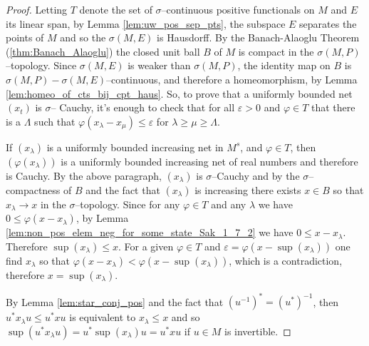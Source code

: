 \begin{proof}
  \leanok
  Letting $T$ denote the set of $\sigma$--continuous positive functionals on $M$ and $E$ its linear span, by
  Lemma \ref{lem:uw_pos_sep_pts}, the subspace $E$ separates the points of $M$ and so the $\sigma(M,E)$
  is Hausdorff. By the Banach-Alaoglu Theorem (\ref{thm:Banach_Alaoglu}) the closed unit ball $B$ of $M$ is
  compact in the $\sigma(M,P)$--topology. Since $\sigma(M,E)$ is weaker than $\sigma(M,P)$, the identity
  map on $B$ is $\sigma(M,P)-\sigma(M,E)$--continuous, and therefore a homeomorphism,
  by Lemma \ref{lem:homeo_of_cts_bij_cpt_haus}. So, to prove that a uniformly bounded net $(x_{t})$ is $\sigma$--
  Cauchy, it's enough to check that for all $\varepsilon>0$ and $\varphi\in T$ that there is a $\Lambda$ such that
  $\varphi(x_{\lambda}-x_{\mu})\le \varepsilon$ for $\lambda \ge \mu \ge \Lambda$.
  
  If $(x_{\lambda})$ is a uniformly bounded increasing net in $M^{s}$, and $\varphi\in T$, then $(\varphi(x_{\lambda}))$ is
  a uniformly bounded increasing net of real numbers and therefore is Cauchy. By the above paragraph, $(x_{\lambda})$ is
  $\sigma$--Cauchy and by the $\sigma$--compactness of $B$ and the fact that $(x_{\lambda})$ is increasing there exists $x\in B$
  so that $x_{\lambda} \to x$ in the $\sigma$--topology. Since for any $\varphi\in T$ and any $\lambda$ we have 
  $0 \le \varphi(x-x_{\lambda})$, by Lemma \ref{lem:non_pos_elem_neg_for_some_state_Sak_1_7_2} we have $0\le x - x_{\lambda}$.
  Therefore $\sup(x_{\lambda})\le x$. For a given $\varphi\in T$ and $\varepsilon = \varphi(x-\sup(x_{\lambda}))$ one find 
  $x_{\lambda}$ so that $\varphi(x-x_{\lambda})<\varphi (x - \sup(x_{\lambda}))$, which is a contradiction, therefore $x=\sup(x_{\lambda})$.

  By Lemma \ref{lem:star_conj_pos} and the fact that $(u^{-1})^{*}=(u^{*})^{-1}$, then $u^{*}x_{\lambda}u\le u^{*}xu$
  is equivalent to $x_{\lambda}\le x$ and so $\sup(u^{*}x_{\lambda}u)=u^{*}\sup(x_{\lambda})u=u^{*}xu$ if $u\in M$ is invertible.


\end{proof}
